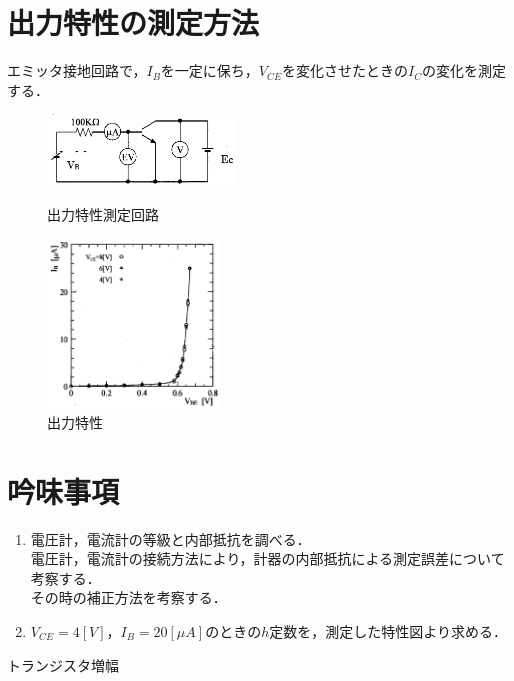 \documentclass[10pt, a4j, dvipdfmx]{jarticle}
\begin{document}
    \section*{出力特性の測定方法}
    エミッタ接地回路で，$I_B$を一定に保ち，$V_{CE}$を変化させたときの$I_C$の変化を測定する．
    \begin{figure}[H]
        \begin{minipage}{0.5\hsize}
            \centering
            \includegraphics[width=50mm]{fig-1.png}
            \caption{出力特性測定回路}
            \label{fig:3}
        \end{minipage}
        \begin{minipage}{0.5\hsize}
            \centering
            \includegraphics[height=45mm]{fig-2.png}
            \caption{出力特性}
            \label{fig:4}
        \end{minipage}
    \end{figure}
    \section*{吟味事項}
    \begin{enumerate}
        \item 電圧計，電流計の等級と内部抵抗を調べる．\\電圧計，電流計の接続方法により，計器の内部抵抗による測定誤差について考察する．\\その時の補正方法を考察する．
        \item $V_{CE} = 4[V]$，$I_B = 20[\mu A]$のときの$h$定数を，測定した特性図より求める．
    \end{enumerate}

    \newpage
    \begin{center}
        \LARGE トランジスタ増幅
    \end{center}
\end{document}
